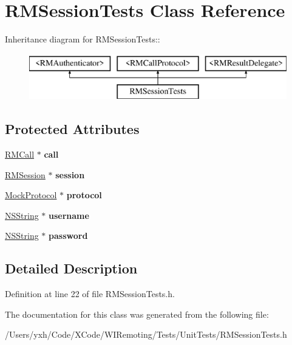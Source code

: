 \hypertarget{interface_r_m_session_tests}{
\section{RMSessionTests Class Reference}
\label{interface_r_m_session_tests}
}
Inheritance diagram for RMSessionTests::\begin{figure}[H]
\begin{center}
\leavevmode
\includegraphics[height=2cm]{interface_r_m_session_tests}
\end{center}
\end{figure}
\subsection*{Protected Attributes}
\begin{DoxyCompactItemize}
\item 
\hypertarget{interface_r_m_session_tests_abeeb4a2ae56b6847a234db1299576652}{
\hyperlink{interface_r_m_call}{RMCall} $\ast$ {\bfseries call}}
\label{interface_r_m_session_tests_abeeb4a2ae56b6847a234db1299576652}

\item 
\hypertarget{interface_r_m_session_tests_a15addac7538f41a12439e0babefa8935}{
\hyperlink{interface_r_m_session}{RMSession} $\ast$ {\bfseries session}}
\label{interface_r_m_session_tests_a15addac7538f41a12439e0babefa8935}

\item 
\hypertarget{interface_r_m_session_tests_a4033c142c7ba3bef1d359ef19b4382a7}{
\hyperlink{interface_mock_protocol}{MockProtocol} $\ast$ {\bfseries protocol}}
\label{interface_r_m_session_tests_a4033c142c7ba3bef1d359ef19b4382a7}

\item 
\hypertarget{interface_r_m_session_tests_ada7aafce83843a941668b5d0f83c9ad3}{
\hyperlink{class_n_s_string}{NSString} $\ast$ {\bfseries username}}
\label{interface_r_m_session_tests_ada7aafce83843a941668b5d0f83c9ad3}

\item 
\hypertarget{interface_r_m_session_tests_a5b3ca57860668a61e67ded4d00a0eac5}{
\hyperlink{class_n_s_string}{NSString} $\ast$ {\bfseries password}}
\label{interface_r_m_session_tests_a5b3ca57860668a61e67ded4d00a0eac5}

\end{DoxyCompactItemize}


\subsection{Detailed Description}


Definition at line 22 of file RMSessionTests.h.

The documentation for this class was generated from the following file:\begin{DoxyCompactItemize}
\item 
/Users/yxh/Code/XCode/WIRemoting/Tests/UnitTests/RMSessionTests.h\end{DoxyCompactItemize}
